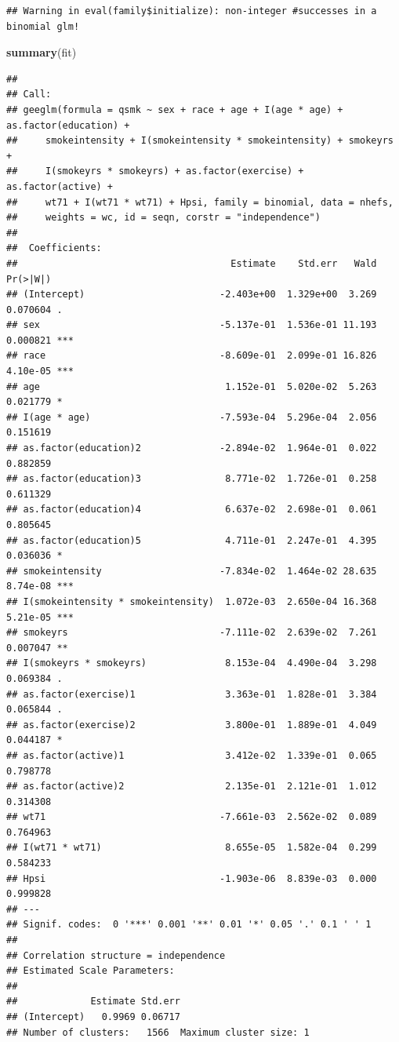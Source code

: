 \documentclass[
  10pt,
]{book}
\newenvironment{Shaded}{\begin{snugshade}}{\end{snugshade}}
\newcommand{\KeywordTok}[1]{\textcolor[rgb]{0.13,0.29,0.53}{\textbf{#1}}}
\newcommand{\NormalTok}[1]{#1}
\begin{document}
\begin{verbatim}
## Warning in eval(family$initialize): non-integer #successes in a binomial glm!
\end{verbatim}

\begin{Shaded}
\begin{Highlighting}[]
\KeywordTok{summary}\NormalTok{(fit)}
\end{Highlighting}
\end{Shaded}

\begin{verbatim}
## 
## Call:
## geeglm(formula = qsmk ~ sex + race + age + I(age * age) + as.factor(education) + 
##     smokeintensity + I(smokeintensity * smokeintensity) + smokeyrs + 
##     I(smokeyrs * smokeyrs) + as.factor(exercise) + as.factor(active) + 
##     wt71 + I(wt71 * wt71) + Hpsi, family = binomial, data = nhefs, 
##     weights = wc, id = seqn, corstr = "independence")
## 
##  Coefficients:
##                                      Estimate    Std.err   Wald Pr(>|W|)    
## (Intercept)                        -2.403e+00  1.329e+00  3.269 0.070604 .  
## sex                                -5.137e-01  1.536e-01 11.193 0.000821 ***
## race                               -8.609e-01  2.099e-01 16.826 4.10e-05 ***
## age                                 1.152e-01  5.020e-02  5.263 0.021779 *  
## I(age * age)                       -7.593e-04  5.296e-04  2.056 0.151619    
## as.factor(education)2              -2.894e-02  1.964e-01  0.022 0.882859    
## as.factor(education)3               8.771e-02  1.726e-01  0.258 0.611329    
## as.factor(education)4               6.637e-02  2.698e-01  0.061 0.805645    
## as.factor(education)5               4.711e-01  2.247e-01  4.395 0.036036 *  
## smokeintensity                     -7.834e-02  1.464e-02 28.635 8.74e-08 ***
## I(smokeintensity * smokeintensity)  1.072e-03  2.650e-04 16.368 5.21e-05 ***
## smokeyrs                           -7.111e-02  2.639e-02  7.261 0.007047 ** 
## I(smokeyrs * smokeyrs)              8.153e-04  4.490e-04  3.298 0.069384 .  
## as.factor(exercise)1                3.363e-01  1.828e-01  3.384 0.065844 .  
## as.factor(exercise)2                3.800e-01  1.889e-01  4.049 0.044187 *  
## as.factor(active)1                  3.412e-02  1.339e-01  0.065 0.798778    
## as.factor(active)2                  2.135e-01  2.121e-01  1.012 0.314308    
## wt71                               -7.661e-03  2.562e-02  0.089 0.764963    
## I(wt71 * wt71)                      8.655e-05  1.582e-04  0.299 0.584233    
## Hpsi                               -1.903e-06  8.839e-03  0.000 0.999828    
## ---
## Signif. codes:  0 '***' 0.001 '**' 0.01 '*' 0.05 '.' 0.1 ' ' 1
## 
## Correlation structure = independence 
## Estimated Scale Parameters:
## 
##             Estimate Std.err
## (Intercept)   0.9969 0.06717
## Number of clusters:   1566  Maximum cluster size: 1
\end{verbatim}
\end{document}
